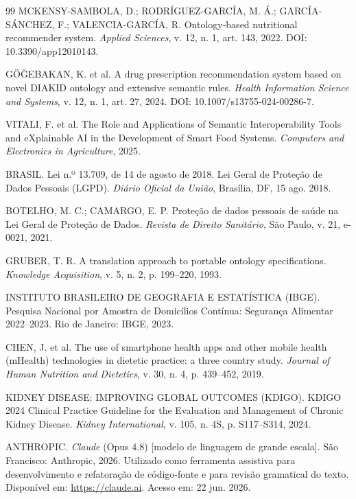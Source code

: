 \documentclass[12pt, a4paper, twocolumn]{article}
\begin{document}
\begin{thebibliography}{99}
    MCKENSY-SAMBOLA, D.; RODRÍGUEZ-GARCÍA, M. Á.; GARCÍA-SÁNCHEZ, F.; VALENCIA-GARCÍA, R. Ontology-based nutritional recommender system. \textit{Applied Sciences}, v. 12, n. 1, art. 143, 2022. DOI: 10.3390/app12010143.

    GÖĞEBAKAN, K. et al. A drug prescription recommendation system based on novel DIAKID ontology and extensive semantic rules. \textit{Health Information Science and Systems}, v. 12, n. 1, art. 27, 2024. DOI: 10.1007/s13755-024-00286-7.

    VITALI, F. et al. The Role and Applications of Semantic Interoperability Tools and eXplainable AI in the Development of Smart Food Systems. \textit{Computers and Electronics in Agriculture}, 2025.

    BRASIL. Lei n.º 13.709, de 14 de agosto de 2018. Lei Geral de Proteção de Dados Pessoais (LGPD). \textit{Diário Oficial da União}, Brasília, DF, 15 ago. 2018.

    BOTELHO, M. C.; CAMARGO, E. P. Proteção de dados pessoais de saúde na Lei Geral de Proteção de Dados. \textit{Revista de Direito Sanitário}, São Paulo, v. 21, e-0021, 2021.

    GRUBER, T. R. A translation approach to portable ontology specifications. \textit{Knowledge Acquisition}, v. 5, n. 2, p. 199--220, 1993.

    INSTITUTO BRASILEIRO DE GEOGRAFIA E ESTATÍSTICA (IBGE). Pesquisa Nacional por Amostra de Domicílios Contínua: Segurança Alimentar 2022--2023. Rio de Janeiro: IBGE, 2023.

    CHEN, J. et al. The use of smartphone health apps and other mobile health (mHealth) technologies in dietetic practice: a three country study. \textit{Journal of Human Nutrition and Dietetics}, v. 30, n. 4, p. 439--452, 2019.

    KIDNEY DISEASE: IMPROVING GLOBAL OUTCOMES (KDIGO). KDIGO 2024 Clinical Practice Guideline for the Evaluation and Management of Chronic Kidney Disease. \textit{Kidney International}, v. 105, n. 4S, p. S117--S314, 2024.

    ANTHROPIC. \textit{Claude} (Opus 4.8) [modelo de linguagem de grande escala]. São Francisco: Anthropic, 2026. Utilizado como ferramenta assistiva para desenvolvimento e refatoração de código-fonte e para revisão gramatical do texto. Disponível em: \url{https://claude.ai}. Acesso em: 22 jun. 2026.

\end{thebibliography}
\end{document}
